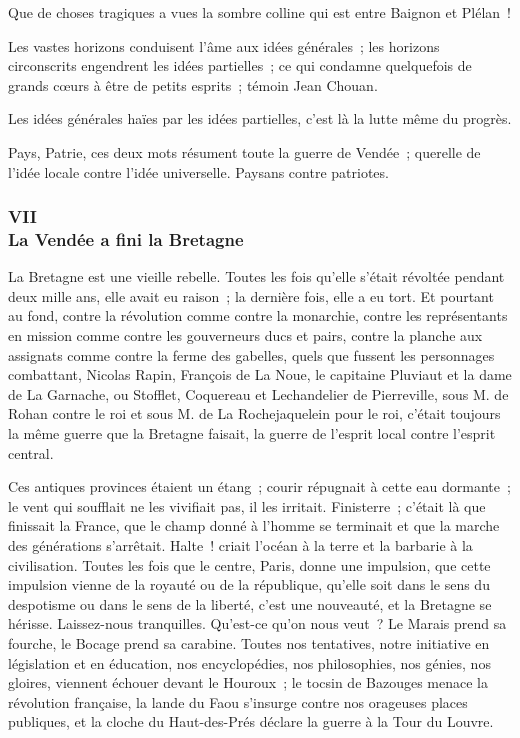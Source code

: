 \documentclass[french,twoside]{book} %
\begin{document}
Que de choses tragiques a vues la sombre colline qui est entre Baignon et Plélan !\par
Les vastes horizons conduisent l’âme aux idées générales ; les horizons circonscrits engendrent les idées partielles ; ce qui condamne quelquefois de grands cœurs à être de petits esprits ; témoin Jean Chouan.\par
Les idées générales haïes par les idées partielles, c’est là la lutte même du progrès.\par
Pays, Patrie, ces deux mots résument toute la guerre de Vendée ; querelle de l’idée locale contre l’idée universelle. Paysans contre patriotes.
 \subsubsection[{VII. La Vendée a fini la Bretagne}]{VII \\
La Vendée a fini la Bretagne}
\label{p3l1c7}
\noindent La Bretagne est une vieille rebelle. Toutes les fois qu’elle s’était révoltée pendant deux mille ans, elle avait eu raison ; la dernière fois, elle a eu tort. Et pourtant au fond, contre la révolution comme contre la monarchie, contre les représentants en mission comme contre les gouverneurs ducs et pairs, contre la planche aux assignats comme contre la ferme des gabelles, quels que fussent les personnages combattant, Nicolas Rapin, François de La Noue, le capitaine Pluviaut et la dame de La Garnache, ou Stofflet, Coquereau et Lechandelier de Pierreville, sous M. de Rohan contre le roi et sous M. de La Rochejaquelein pour le roi, c’était toujours la même guerre que la Bretagne faisait, la guerre de l’esprit local contre l’esprit central.\par
Ces antiques provinces étaient un étang ; courir répugnait à cette eau dormante ; le vent qui soufflait ne les vivifiait pas, il les irritait. Finisterre ; c’était là que finissait la France, que le champ donné à l’homme se terminait et que la marche des générations s’arrêtait. Halte ! criait l’océan à la terre et la barbarie à  la civilisation. Toutes les fois que le centre, Paris, donne une impulsion, que cette impulsion vienne de la royauté ou de la république, qu’elle soit dans le sens du despotisme ou dans le sens de la liberté, c’est une nouveauté, et la Bretagne se hérisse. Laissez-nous tranquilles. Qu’est-ce qu’on nous veut ? Le Marais prend sa fourche, le Bocage prend sa carabine. Toutes nos tentatives, notre initiative en législation et en éducation, nos encyclopédies, nos philosophies, nos génies, nos gloires, viennent échouer devant le Houroux ; le tocsin de Bazouges menace la révolution française, la lande du Faou s’insurge contre nos orageuses places publiques, et la cloche du Haut-des-Prés déclare la guerre à la Tour du Louvre.\par
\end{document}

